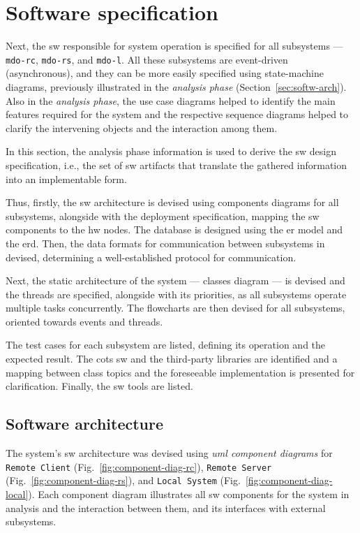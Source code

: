 %
\section{Software specification}
\label{sec:sw-specs}
Next, the \gls{sw} responsible for system operation is specified for all
subsystems --- \texttt{\acrfull{mdo-rc}}, \texttt{\acrfull{mdo-rs}}, and
\texttt{\acrfull{mdo-l}}.
All these subsystems are event-driven (asynchronous), and they can be more easily
specified using state-machine diagrams, previously illustrated in the
\emph{analysis phase} (Section~\ref{sec:softw-arch}). Also in the \emph{analysis
phase}, the use case diagrams helped to identify the main features required for
the system and the respective sequence diagrams helped to clarify the
intervening objects and the interaction among them.

In this section, the analysis phase information is used to derive the
\gls{sw} design specification, i.e., the set of \gls{sw} artifacts that
translate the gathered information into an implementable form.

Thus, firstly, the \gls{sw} architecture is devised using components diagrams
for all subsystems, alongside with the deployment specification, mapping the
\gls{sw} components to the \gls{hw} nodes. The database is designed using the
\gls{er} model and the \gls{erd}. Then, the data formats for communication
between subsystems in devised, determining a well-established protocol for communication.

Next, the static architecture of the system --- classes diagram --- is devised
and the threads are specified, alongside with its priorities, as all subsystems
operate multiple tasks concurrently. The flowcharts are then devised for all
subsystems, oriented towards events and threads.

The test
cases for each subsystem are listed, defining its operation and the expected
result. The \gls{cots} \gls{sw} and the third-party libraries are identified
and a mapping between class topics and the foreseeable implementation is
presented for clarification. Finally, the \gls{sw} tools are listed.

\subsection{Software architecture}
\label{sec:softw-arch-1}
The system's \gls{sw} architecture was devised using \emph{\gls{uml} component
  diagrams} for \texttt{Remote Client} (Fig.~\ref{fig:component-diag-rc}), \texttt{Remote Server} (Fig.~\ref{fig:component-diag-rs}), and
\texttt{Local System} (Fig.~\ref{fig:component-diag-local}). Each component
diagram illustrates all \gls{sw} components for the system in analysis and the
interaction between them, and its
interfaces with external subsystems.

